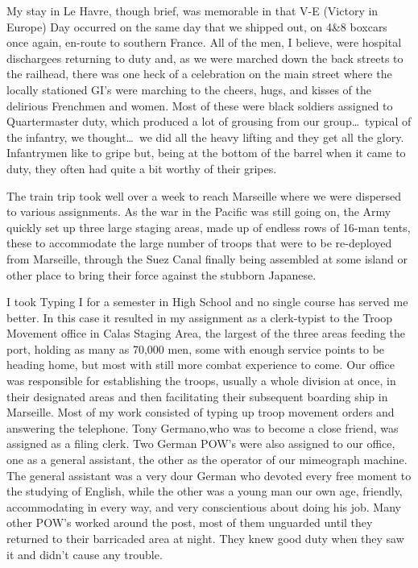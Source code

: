 \documentclass[../m3y]{subfiles}
\begin{document}
My stay in Le\thinspace{} Havre, though brief, was memorable in that V-E (Victory in Europe) Day occurred on the same day that we shipped out, on 4\&8 boxcars once again, en-route to southern France. All of the men, I believe, were hospital dischargees returning to duty and, as we were marched down the back streets to the railhead, there was one heck of a celebration on the main street where the locally stationed GI's were marching to the cheers, hugs, and kisses of the delirious Frenchmen and women. Most of these were black soldiers assigned to Quartermaster duty, which produced a lot of grousing from our group\ldots\ typical of the infantry, we thought\ldots\ we did all the heavy lifting and they get all the glory. Infantrymen like to gripe but, being at the bottom of the barrel when it came to duty, they often had quite a bit worthy of their gripes.

The train trip took well over a week to reach Marseille where we were dispersed to various assignments. As the war in the Pacific was still going on, the Army quickly set up three large staging areas, made up of endless rows of 16-man tents, these to accommodate the large number of troops that were to be re-deployed from Marseille, through the Suez Canal finally being assembled at some island or other place to bring their force against the stubborn Japanese.

I took Typing I for a semester in High School and no single course has served me better. In this case it resulted in my assignment as a clerk-typist to the Troop Movement office in Calas Staging Area, the largest of the three areas feeding the port, holding as many as 70,000 men, some with enough service points to be heading home, but most with still more combat experience to come. Our office was responsible for establishing the troops, usually a whole division at once, in their designated areas and then facilitating their subsequent boarding ship in Marseille. Most of my work consisted of typing up troop movement orders and answering the telephone. Tony Germano,who was to become a close friend, was assigned as a filing clerk. Two German POW's were also assigned to our office, one as a general assistant, the other as the operator of our mimeograph machine. The general assistant was a very dour German who devoted every free moment to the studying of English, while the other was a young man our own age, friendly, accommodating in every way, and very conscientious about doing his job. Many other POW's worked around the post, most of them unguarded until they returned to their barricaded area at night. They knew good duty when they saw it and didn't cause any trouble.
\end{document}
